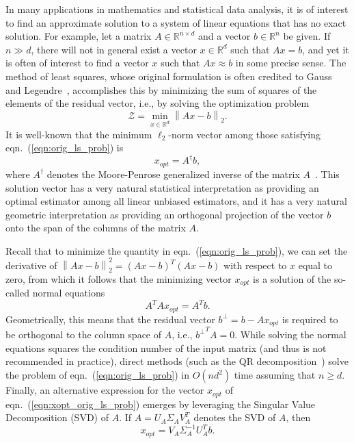\documentclass[11pt]{article}
\newcommand{\VTTNorm }[1]{\mbox{}\left\|#1\right\|_2  }
\newcommand{\VTTNormS}[1]{\mbox{}\left\|#1\right\|_2^2}
\begin{document}
In many applications in mathematics and statistical data analysis, it is of interest to find an approximate solution to a system of linear equations that has no exact solution. For example, let a
matrix $A \in \mathbb{R}^{n \times d}$ and a vector $b \in \mathbb{R}^n$ be given. If $n \gg d$, there will not in general exist a vector $x \in \mathbb{R}^d$ such that $Ax=b$, and yet it is
often of interest to find a vector $x$ such that $Ax \approx b$ in some precise sense. The method of least squares, whose original formulation is often credited to Gauss and Legendre~\cite{Stigler86}, accomplishes this by minimizing the sum of squares of the elements of the residual vector, i.e., by solving the optimization problem
\begin{equation}
\label{eqn:orig_ls_prob}
\mathcal{Z} = \min_{x \in \mathbb{R}^d}
\VTTNorm{Ax - b}.
\end{equation}
It is well-known that the minimum $\ell_2$-norm vector among those satisfying eqn.~(\ref{eqn:orig_ls_prob}) is
\begin{equation}
\label{eqn:xopt_orig_ls_prob}
x_{opt} = A^{\dagger}b,
\end{equation}
where $A^{\dagger}$ denotes the Moore-Penrose generalized inverse of the matrix $A$~\cite{BIG03,GVL96}. This solution vector has a very natural statistical interpretation as providing an optimal estimator among all linear unbiased estimators, and it has a very natural geometric interpretation as providing an orthogonal projection of the vector $b$ onto the span of the columns of the matrix $A$.

Recall that to minimize the quantity in eqn.~(\ref{eqn:orig_ls_prob}), we can set the derivative of $\VTTNormS{Ax-b}=(Ax-b)^T(Ax-b)$ with respect to $x$ equal to zero, from which it follows that the minimizing vector $x_{opt}$ is a solution of the so-called normal equations
\begin{equation}
\label{eqn:normal_eqn}
A^TAx_{opt}=A^Tb  .
\end{equation}
Geometrically, this means that the residual vector $b^{\perp}=b-Ax_{opt}$ is required to be orthogonal to the column space of $A$, i.e., ${b^{\perp}}^TA=0$. While solving the normal equations squares the condition number of the input matrix (and thus is not recommended in practice), direct methods (such as the QR decomposition~\cite{GVL96}) solve the problem of eqn.~(\ref{eqn:orig_ls_prob}) in $O(nd^2)$ time assuming that $n \geq d$. Finally, an alternative expression for the vector $x_{opt}$ of eqn.~(\ref{eqn:xopt_orig_ls_prob}) emerges by leveraging the Singular Value Decomposition (SVD) of $A$. If $A = U_A\Sigma_A V_A^T$ denotes the SVD of $A$, then
\begin{equation*}
x_{opt}=V_A\Sigma_A^{-1}U_A^Tb.
\end{equation*}
\end{document}
